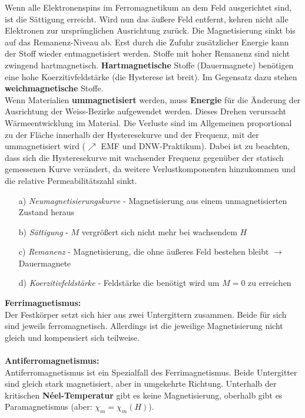 Wenn alle Elektronenspins im Ferromagnetikum an dem Feld ausgerichtet sind, ist die Sättigung erreicht. Wird nun das äußere Feld entfernt, kehren nicht alle Elektronen zur ursprünglichen Ausrichtung zurück. Die Magnetisierung sinkt bis auf das Remanenz-Niveau ab. Erst durch die Zufuhr zusätzlicher Energie kann der Stoff wieder entmagnetisiert werden. Stoffe mit hoher Remanenz sind nicht zwingend hartmagnetisch. \textbf{Hartmagnetische} Stoffe (Dauermagnete) benötigen eine hohe Koerzitivfeldstärke (die Hysterese ist breit). Im Gegensatz dazu stehen \textbf{weichmagnetische} Stoffe.\\
Wenn Materialien \textbf{ummagnetisiert} werden, muss \textbf{Energie} für die Änderung der Ausrichtung der Weiss-Bezirke aufgewendet werden. Dieses Drehen verursacht Wärmeentwicklung im Material. Die Verluste sind im Allgemeinen proportional zu der Fläche innerhalb der Hysteresekurve und der Frequenz, mit der ummagnetisiert wird ($\nearrow$ EMF und DNW-Praktikum). Dabei ist zu beachten, dass sich die Hysteresekurve mit wachsender Frequenz gegenüber der statisch gemessenen Kurve verändert, da weitere Verlustkomponenten hinzukommen und die relative Permeabilitätszahl sinkt. 
		  \begin{center}
			  
		  \end{center}
		  \begin{itemize}
		  	\item[a)] \textit{Neumagnetisierungskurve} - Magnetisierung aus einem unmagnetisierten Zustand heraus
		  	\item[b)] \textit{Sättigung} - $M$ vergrößert sich nicht mehr bei wachsendem $H$
		  	\item[c)] \textit{Remanenz} - Magnetisierung, die ohne äußeres Feld bestehen bleibt $\to$ Dauermagnete
		  	\item[d)] \textit{Koerzitivfeldstärke} - Feldstärke die benötigt wird um $M=0$ zu erreichen
		  \end{itemize}
		  
	  \textbf{Ferrimagnetismus:}\\
		Der Festkörper setzt sich hier aus zwei Untergittern zusammen.			         Beide für sich sind jeweils ferromagnetisch. Allerdings ist die jeweilige Magnetisierung nicht gleich und kompensiert sich teilweise.\\\\
	\textbf{Antiferromagnetismus:}\\
				        Antiferromagnetismus ist ein Spezialfall des Ferrimagnetismus. Beide Untergitter sind gleich stark magnetisiert, aber in umgekehrte Richtung.
				         Unterhalb der kritischen \textbf{N{\'e}el-Temperatur} gibt es keine Magnetisierung, oberhalb gibt es Paramagnetismus (aber: $\chi_m=\chi_m(H)$).
